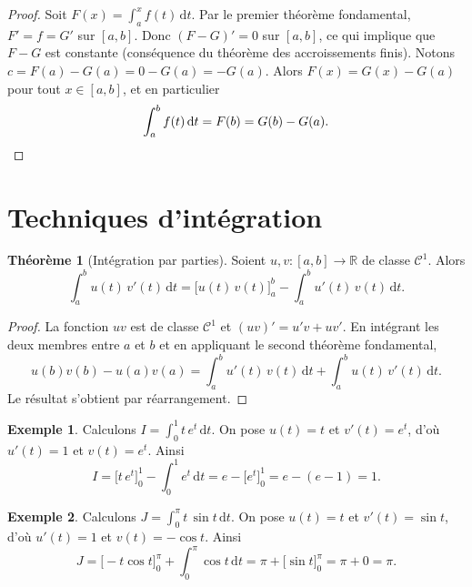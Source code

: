\documentclass[12pt,a4paper,openany]{book}
\theoremstyle{definition}
\newtheorem{theoreme}{Théorème}[chapter]
\newtheorem{exemple}{Exemple}[chapter]
\newcommand{\R}{\mathbb{R}}
\newcommand{\dd}{\mathrm{d}}
\begin{document}
\begin{proof}
  Soit $F(x) = \int_a^x f(t)\,\dd t$. Par le premier théorème fondamental, $F' = f = G'$ sur $[a,b]$. Donc $(F - G)' = 0$ sur $[a,b]$, ce qui implique que $F - G$ est constante (conséquence du théorème des accroissements finis). Notons $c = F(a) - G(a) = 0 - G(a) = -G(a)$. Alors $F(x) = G(x) - G(a)$ pour tout $x \in [a,b]$, et en particulier
  \[
    \int_a^b f(t)\,\dd t = F(b) = G(b) - G(a). \qedhere
  \]
\end{proof}

\section{Techniques d'intégration}
\label{sec:techniques-integration}

\begin{theoreme}[Intégration par parties]\label{thm:ipp}
  Soient $u, v \colon [a,b] \to \R$ de classe $\mathcal{C}^1$. Alors
  \[
    \int_a^b u(t)\, v'(t)\,\dd t = \bigl[u(t)\,v(t)\bigr]_a^b - \int_a^b u'(t)\, v(t)\,\dd t.
  \]
\end{theoreme}

\begin{proof}
  La fonction $uv$ est de classe $\mathcal{C}^1$ et $(uv)' = u'v + uv'$. En intégrant les deux membres entre $a$ et $b$ et en appliquant le second théorème fondamental,
  \[
    u(b)v(b) - u(a)v(a) = \int_a^b u'(t)\,v(t)\,\dd t + \int_a^b u(t)\,v'(t)\,\dd t.
  \]
  Le résultat s'obtient par réarrangement.
\end{proof}

\begin{exemple}\label{ex:ipp1}
  Calculons $\displaystyle I = \int_0^1 t\, e^t\,\dd t$.
  On pose $u(t) = t$ et $v'(t) = e^t$, d'où $u'(t) = 1$ et $v(t) = e^t$. Ainsi
  \[
    I = \bigl[t\, e^t\bigr]_0^1 - \int_0^1 e^t\,\dd t = e - \bigl[e^t\bigr]_0^1 = e - (e - 1) = 1.
  \]
\end{exemple}

\begin{exemple}\label{ex:ipp2}
  Calculons $\displaystyle J = \int_0^{\pi} t\,\sin t\,\dd t$.
  On pose $u(t) = t$ et $v'(t) = \sin t$, d'où $u'(t) = 1$ et $v(t) = -\cos t$. Ainsi
  \[
    J = \bigl[-t\cos t\bigr]_0^{\pi} + \int_0^{\pi}\cos t\,\dd t = \pi + \bigl[\sin t\bigr]_0^{\pi} = \pi + 0 = \pi.
  \]
\end{exemple}
\end{document}
